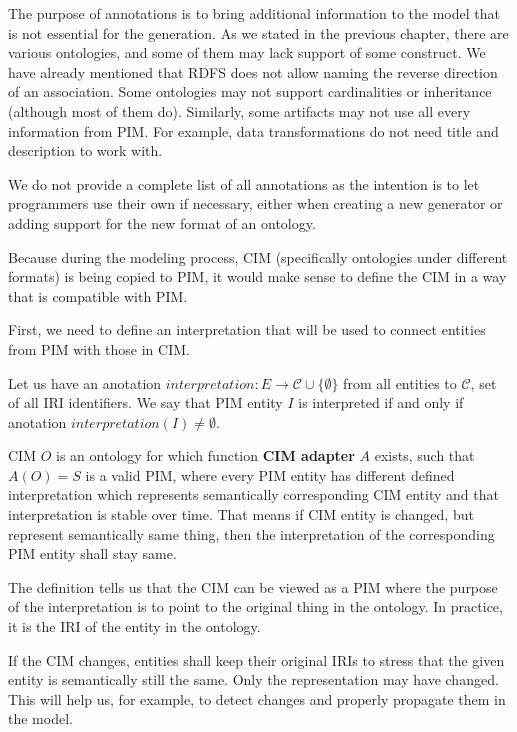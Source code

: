 The purpose of annotations is to bring additional information to the model that is not essential for the generation. As we stated in the previous chapter, there are various ontologies, and some of them may lack support of some construct. We have already mentioned that RDFS does not allow naming the reverse direction of an association. Some ontologies may not support cardinalities or inheritance (although most of them do). Similarly, some artifacts may not use all every information from PIM. For example, data transformations do not need title and description to work with.

We do not provide a complete list of all annotations as the intention is to let programmers use their own if necessary, either when creating a new generator or adding support for the new format of an ontology.

\bigskip

Because during the modeling process, CIM (specifically ontologies under different formats) is being copied to PIM, it would make sense to define the CIM in a way that is compatible with PIM.

First, we need to define an interpretation that will be used to connect entities from PIM with those in CIM.

\begin{definition}[interpretation]
    Let us have an anotation $interpretation: E \rightarrow \mathcal{C} \cup \{\emptyset\}$ from all entities to $\mathcal{C}$, set of all IRI identifiers. We say that PIM entity $I$ is interpreted if and only if anotation $interpretation(I) \neq \emptyset$.
\end{definition}

\begin{definition}[CIM]
    CIM $O$ is an ontology for which function \textbf{CIM adapter} $A$ exists, such that $A(O) = S$ is a valid PIM, where every PIM entity has different defined interpretation which represents semantically corresponding CIM entity and that interpretation is stable over time. That means if CIM entity is changed, but represent semantically same thing, then the interpretation of the corresponding PIM entity shall stay same.
\end{definition}

The definition tells us that the CIM can be viewed as a PIM where the purpose of the interpretation is to point to the original thing in the ontology. In practice, it is the IRI of the entity in the ontology.

If the CIM changes, entities shall keep their original IRIs to stress that the given entity is semantically still the same. Only the representation may have changed. This will help us, for example, to detect changes and properly propagate them in the model.

